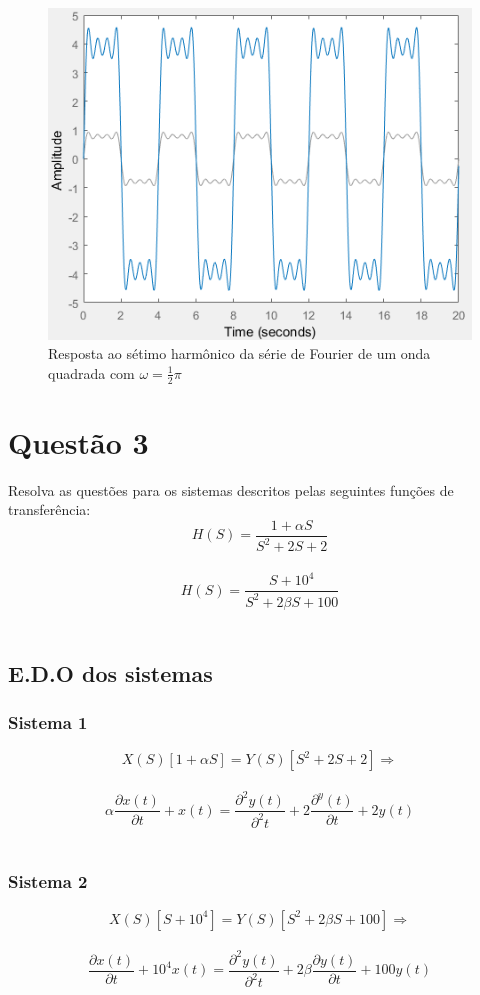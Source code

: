 \documentclass[a4paper, 12pt]{article}
\begin{document}
			\begin{figure}[!ht]
				\centering
				\includegraphics[scale=0.71]{img/2l.png}
				\caption{Resposta ao sétimo harmônico da série de Fourier de um onda quadrada com $\omega = \frac{1}{2}\pi$}
			\end{figure}
			\clearpage

	\section{Quest\~{a}o 3}
		Resolva as questões para os sistemas descritos pelas seguintes funções de transferência:
		\[
		H(S)= \frac{1 + \alpha S}{S^{2} + 2S +  2}
		\] 	\\
		\[
		H(S)= \frac{S + 10^{4}}{S^{2} + 2\beta S +  100}
		\] 	\\

		\subsection{E.D.O dos sistemas}

			\subsubsection{Sistema 1}
				\[
				X(S)[1+ \alpha S] = Y(S)[S^{2} + 2S + 2] \Rightarrow
				\] 	\\
				\[
				\alpha \frac{\partial x(t)}{\partial t} + x(t) = \frac{\partial^{2}y(t)}{\partial^{2}t} + 2\frac{\partial^y(t)}{\partial t} + 2y(t)
				\] 	\\
			\subsubsection{Sistema 2}
				\[
				X(S)[S + 10^{4}] = Y(S)[S^{2} + 2\beta S +  100] \Rightarrow
				\] 	\\
				\[
				\frac{\partial x(t)}{\partial t} + 10^{4}x(t) = \frac{\partial^{2}y(t)}{\partial^{2}t} + 2 \beta\frac{\partial y(t)}{\partial t} + 100y(t)
				\] 	\\
				\newpage
\end{document}
